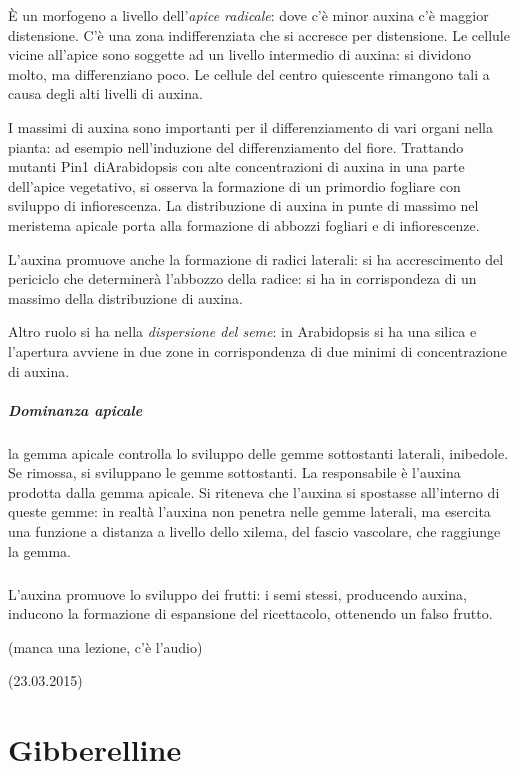 \documentclass[a4paper,12pt]{book}
\begin{document}
È un morfogeno a livello dell'\emph{apice radicale}: dove c'è minor auxina c'è maggior distensione. C'è una zona indifferenziata che si accresce per distensione. Le cellule vicine all'apice sono soggette ad un livello intermedio di auxina: si dividono molto, ma differenziano poco. Le cellule del centro quiescente rimangono tali a causa degli alti livelli di auxina. 

I massimi di auxina sono importanti per il differenziamento di vari organi nella pianta: ad esempio nell'induzione del differenziamento del fiore. Trattando mutanti Pin1 diArabidopsis con alte concentrazioni di auxina in una parte dell'apice vegetativo, si osserva la formazione di un primordio fogliare con sviluppo di infiorescenza. La distribuzione di auxina in punte di massimo nel meristema apicale porta alla formazione di abbozzi fogliari e di infiorescenze.

L'auxina promuove anche la formazione di radici laterali: si ha accrescimento del periciclo che determinerà l'abbozzo della radice: si ha in corrispondeza di un massimo della distribuzione di auxina.

Altro ruolo si ha nella \emph{dispersione del seme}: in Arabidopsis si ha una silica e l'apertura avviene in due zone in corrispondenza di due minimi di concentrazione di auxina.

\paragraph{Dominanza apicale} la gemma apicale controlla lo sviluppo delle gemme sottostanti laterali, inibedole. Se rimossa, si sviluppano le gemme sottostanti. La responsabile è l'auxina prodotta dalla gemma apicale. Si riteneva che l'auxina si spostasse all'interno di queste gemme: in realtà l'auxina non penetra nelle gemme laterali, ma esercita una funzione a distanza a livello dello xilema, del fascio vascolare, che raggiunge la gemma.

\paragraph{}
L'auxina promuove lo sviluppo dei frutti: i semi stessi, producendo auxina, inducono la formazione di espansione del ricettacolo, ottenendo un falso frutto.

(manca una lezione, c'è l'audio)

(23.03.2015)
 
\chapter{Gibberelline}
\end{document}
